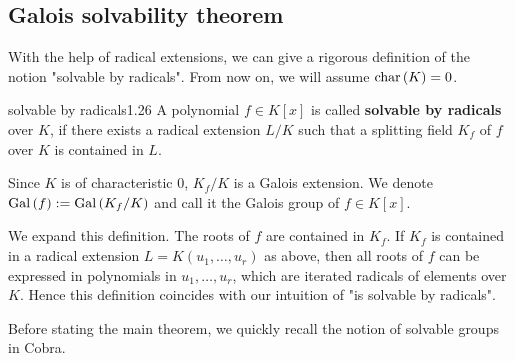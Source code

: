 \documentclass[twoside = false,	%
		headsepline,		%
		parskip = true,
		]{scrbook}						%
\begin{document}
    \subsection{Galois solvability theorem}
        With the help of radical extensions, we can give a rigorous definition of the notion "solvable by radicals". From now on, we will assume $\mathrm{char} \,(K)=0$.
        \begin{definition}{solvable by radicals}{1.26}
            A polynomial $f\in K[x]$ is called \textbf{solvable by radicals} over $K$, if there exists a radical extension $L/K$ such that a splitting field $K_f$ of $f$ over $K$ is contained in $L$.
            
            Since $K$ is of characteristic 0, $K_f/K$ is a Galois extension. We denote $\mathrm{Gal}\left( f\right):=\mathrm{Gal}\left( K_f/K\right)$ and call it the Galois group of $f\in K[x]$.
        \end{definition}
        We expand this definition. The roots of $f$ are contained in $K_f$. If $K_f$ is contained in  a radical extension $L=K(u_1,\dots,u_r)$ as above, then all roots of $f$ can be expressed in polynomials in $u_1,\dots,u_r$, which are iterated radicals of elements over $K$. Hence this definition coincides with our intuition of "is solvable by radicals".
        
        Before stating the main theorem, we quickly recall the notion of solvable groups in Cobra.
        
\end{document}
